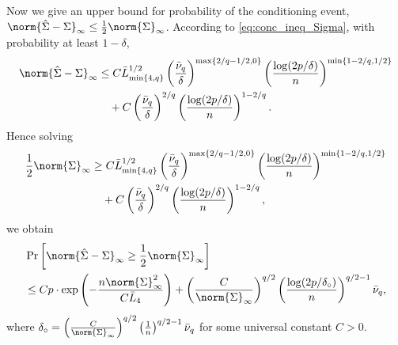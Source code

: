 \documentclass[aos]{imsart}
\begin{document}
\begin{appendix}
\smallskip
Now we give an upper bound for probability of the conditioning event, $\norm{\hat\Sigma - \Sigma}_\infty \leq \frac{1}{2} \norm{\Sigma}_\infty$.
According to \cref{eq:conc_ineq_Sigma}, with probability at least $1 - \delta$,
\begin{equation*}
\begin{aligned}
    \norm{\hat\Sigma - \Sigma}_\infty 
    & \leq C \bar{L}_{\min\{4, q\}}^{1/2} \left(\frac{\bar{\nu}_{q}}{\delta} \right)^{\max\{2/q-1/2,0\}}
    \left(\frac{\log(2p/\delta)}{n}\right)^{\min\{1-2/q, 1/2\}} \\
    & \quad + C \left(\frac{\bar{\nu}_{q}}{\delta} \right)^{2/q} \left(\frac{\log(2p/\delta)}{n}\right)^{1-2/q}. \\
\end{aligned}
\end{equation*}
Hence solving 
\begin{equation*}
\begin{aligned}
    \frac{1}{2} \norm{\Sigma}_\infty 
    & \geq C \bar{L}_{\min\{4, q\}}^{1/2} \left(\frac{\bar{\nu}_{q}}{\delta} \right)^{\max\{2/q-1/2,0\}}
    \left(\frac{\log(2p/\delta)}{n}\right)^{\min\{1-2/q, 1/2\}} \\
    & \quad + C \left(\frac{\bar{\nu}_{q}}{\delta} \right)^{2/q} \left(\frac{\log(2p/\delta)}{n}\right)^{1-2/q}, \\
\end{aligned}
\end{equation*}
we obtain
\begin{equation*}
\begin{aligned}
    & \Pr\left[
        \norm{\hat\Sigma - \Sigma}_\infty \geq \frac{1}{2} \norm{\Sigma}_\infty
    \right] \\
    & \leq C p \cdot \exp\left( - \frac{n \norm{\Sigma}_\infty^2}{C \bar{L}_4} \right) 
    + \left( \frac{C}{\norm{\Sigma}_\infty} \right)^{q/2} \left( \frac{\log(2p/\delta_\circ)}{n} \right)^{q/2 - 1} \bar\nu_q,
\end{aligned}
\end{equation*}
where $\delta_\circ = \left( \frac{C}{\norm{\Sigma}_\infty} \right)^{q/2} \left( \frac{1}{n} \right)^{q/2 - 1} \bar\nu_q$ for some universal constant $C > 0$.


\end{appendix}
\end{document}
